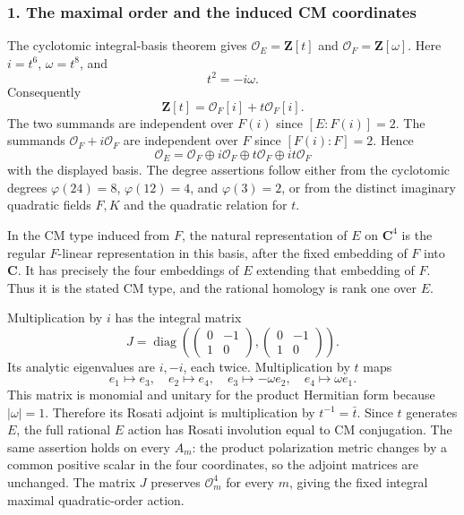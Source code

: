 \documentclass[11pt,a4paper]{article}
\theoremstyle{definition}
\begin{document}
\subsubsection{1. The maximal order and the induced CM coordinates}\label{the-maximal-order-and-the-induced-cm-coordinates}

The cyclotomic integral-basis theorem gives \(\mathcal O_E=\mathbf Z[t]\) and \(\mathcal O_F=\mathbf Z[\omega]\). Here \(i=t^6\), \(\omega=t^8\), and \[
 t^2=-i\omega.
\] Consequently \[
 \mathbf Z[t]=\mathcal O_F[i]+t\mathcal O_F[i].
\] The two summands are independent over \(F(i)\) since \([E:F(i)]=2\). The summands \(\mathcal O_F+i\mathcal O_F\) are independent over \(F\) since \([F(i):F]=2\). Hence \[
 \mathcal O_E=\mathcal O_F\oplus i\mathcal O_F
               \oplus t\mathcal O_F\oplus it\mathcal O_F
\tag{B25a.5}
\] with the displayed basis. The degree assertions follow either from the cyclotomic degrees \(\varphi(24)=8\), \(\varphi(12)=4\), and \(\varphi(3)=2\), or from the distinct imaginary quadratic fields \(F,K\) and the quadratic relation for \(t\).

In the CM type induced from \(F\), the natural representation of \(E\) on \(\mathbf C^4\) is the regular \(F\)-linear representation in this basis, after the fixed embedding of \(F\) into \(\mathbf C\). It has precisely the four embeddings of \(E\) extending that embedding of \(F\). Thus it is the stated CM type, and the rational homology is rank one over \(E\).

Multiplication by \(i\) has the integral matrix \[
 J=\operatorname{diag}\left(
 \begin{pmatrix}0&-1\\1&0\end{pmatrix},
 \begin{pmatrix}0&-1\\1&0\end{pmatrix}\right).
\tag{B25a.6}
\] Its analytic eigenvalues are \(i,-i\), each twice. Multiplication by \(t\) maps \[
 e_1\mapsto e_3,\quad e_2\mapsto e_4,\quad
 e_3\mapsto-\omega e_2,\quad e_4\mapsto\omega e_1.
\tag{B25a.7}
\] This matrix is monomial and unitary for the product Hermitian form because \(|\omega|=1\). Therefore its Rosati adjoint is multiplication by \(t^{-1}=\bar t\). Since \(t\) generates \(E\), the full rational \(E\) action has Rosati involution equal to CM conjugation. The same assertion holds on every \(A_m\): the product polarization metric changes by a common positive scalar in the four coordinates, so the adjoint matrices are unchanged. The matrix \(J\) preserves \(\mathcal O_m^4\) for every \(m\), giving the fixed integral maximal quadratic-order action.
\end{document}
